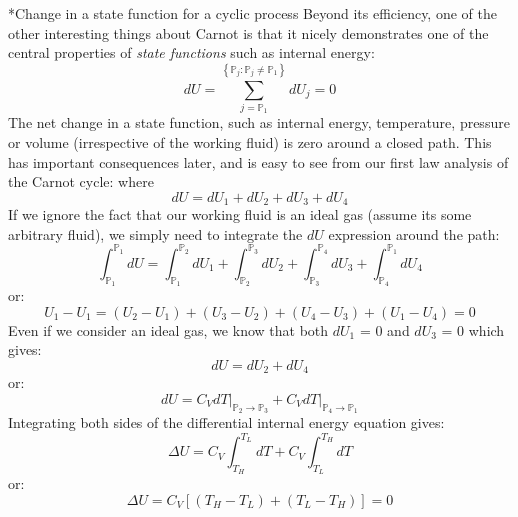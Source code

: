 \documentclass[11pt]{article}
\makeatletter
\theoremstyle{definition}
\renewcommand\subsubsection{\@startsection
	{subsubsection}{2}{0mm}
	{-0.05in}
	{-0.5\baselineskip}
	{\normalfont\normalsize\bfseries}}
\makeatother
\begin{document}
\subsubsection*{Change in a state function for a cyclic process}
Beyond its efficiency, one of the other interesting things about Carnot is that it nicely demonstrates one of the central properties of \textit{state functions}
such as internal energy:
\begin{equation}
dU = \sum_{j=\mathbb{P}_{1}}^{\left\{\mathbb{P}_{j}:\mathbb{P}_{j}\neq\mathbb{P}_{1}\right\}}dU_j = 0
\end{equation}The net change in a state function, such as internal energy, temperature, pressure or volume (irrespective of the working fluid) is zero around a closed path.
This has important consequences later, and is easy to see from our first law analysis of the Carnot cycle: where
\begin{equation}
dU = dU_{1}+dU_{2}+dU_{3}+dU_{4}
\end{equation}If we ignore the fact that our working fluid is an ideal gas (assume its some arbitrary fluid), we simply need to integrate the $dU$ expression around the
path:
\begin{equation}
\int_{\mathbb{P}_{1}}^{\mathbb{P}_{1}}dU = \int_{\mathbb{P}_{1}}^{\mathbb{P}_{2}}dU_{1}+\int_{\mathbb{P}_{2}}^{\mathbb{P}_{3}}dU_{2}+\int_{\mathbb{P}_{3}}^{\mathbb{P}_{4}}dU_{3}+\int_{\mathbb{P}_{4}}^{\mathbb{P}_{1}}dU_{4}
\end{equation}or:
\begin{equation}
U_{1} - U_{1} = \left(U_{2} - U_{1}\right) + \left(U_{3} - U_{2}\right) + \left(U_{4} - U_{3}\right) + \left(U_{1} - U_{4}\right) = 0
\end{equation}Even if we consider an ideal gas, we know that both $dU_{1}$ = 0 and $dU_{3}$ = 0 which gives:
\begin{equation}
dU  = dU_{2} + dU_{4}
\end{equation}or:
\begin{equation}
dU = C_{V}dT\Bigr|_{\mathbb{P}_{2}\rightarrow\mathbb{P}_{3}}+C_{V}dT\Bigr|_{\mathbb{P}_{4}\rightarrow\mathbb{P}_{1}}
\end{equation}Integrating both sides of the differential internal energy equation gives:
\begin{equation}
\Delta{U} = C_{V}\int_{T_{H}}^{T_{L}}dT+C_{V}\int_{T_{L}}^{T_{H}}dT
\end{equation}or:
\begin{equation}
\Delta{U} = C_{V}\left[\left(T_{H} - T_{L}\right)+\left(T_{L} - T_{H}\right)\right] = 0
\end{equation}
\end{document}
